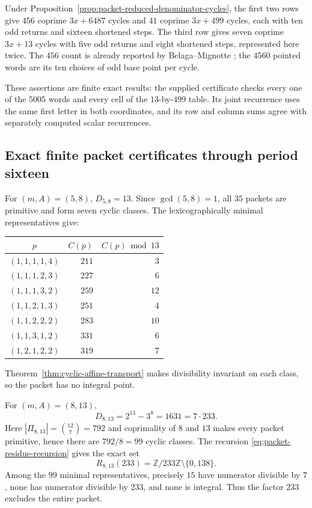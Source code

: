 Under Proposition~\ref{prop:packet-reduced-denominator-cycles}, the first two
rows give $456$ coprime $3x+6487$ cycles and $41$ coprime $3x+499$ cycles,
each with ten odd returns and sixteen shortened steps.  The third row gives
seven coprime $3x+13$ cycles with five odd returns and eight shortened steps,
represented here twice.  The $456$ count is already reported by
Belaga--Mignotte \cite[Example~8.5(1)]{BelagaMignotte2000}; the $4560$
pointed words are its ten choices of odd base point per cycle.

These assertions are finite exact results: the supplied certificate checks
every one of the $5005$ words and every cell of the $13$-by-$499$ table.
Its joint recurrence uses the same first letter in both coordinates, and
its row and column sums agree with separately computed scalar recurrences.

\subsection{Exact finite packet certificates through period sixteen}

For $(m,A)=(5,8)$, $D_{5,8}=13$.  Since $\gcd(5,8)=1$, all $35$
packets are primitive and form seven cyclic classes.  The lexicographically
minimal representatives give:
\begin{center}
\begin{tabular}{c r r}
\toprule
$p$ & $C(p)$ & $C(p)\bmod13$\\
\midrule
$(1,1,1,1,4)$ & $211$ & $3$\\
$(1,1,1,2,3)$ & $227$ & $6$\\
$(1,1,1,3,2)$ & $259$ & $12$\\
$(1,1,2,1,3)$ & $251$ & $4$\\
$(1,1,2,2,2)$ & $283$ & $10$\\
$(1,1,3,1,2)$ & $331$ & $6$\\
$(1,2,1,2,2)$ & $319$ & $7$\\
\bottomrule
\end{tabular}
\end{center}
Theorem~\ref{thm:cyclic-affine-transport} makes divisibility invariant on
each class, so the packet has no integral point.

For $(m,A)=(8,13)$,
\[
 D_{8,13}=2^{13}-3^8=1631=7\cdot233.
\]
Here $|\Pi_{8,13}|=\binom{12}{7}=792$ and coprimality of $8$ and $13$
makes every packet primitive, hence there are $792/8=99$ cyclic classes.
The recursion \eqref{eq:packet-residue-recursion} gives the exact set
\begin{equation}
 R_{8,13}(233)=\mathbb Z/233\mathbb Z\setminus\{0,138\}.
 \label{eq:period-eight-residue-set}
\end{equation}
Among the $99$ minimal representatives, precisely $15$ have numerator
divisible by $7$, none has numerator divisible by $233$, and none is
integral.  Thus the factor $233$ excludes the entire packet.

